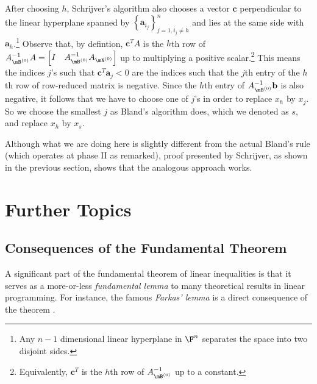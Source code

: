 \documentclass{article}
\renewcommand{\vec}{\mathbf}
\begin{document}
After choosing $h$, Schrijver's algorithm also chooses a vector $\vec{c}$ perpendicular to the linear hyperplane spanned by $\left\lbrace \vec{a}_{i_j} \right\rbrace ^n_{j=1,i_j\neq h}$ and lies at the same side with $\vec{a}_h$.\footnote{Any $n-1$ dimensional linear hyperplane in $\F^n$ separates the space into two disjoint sides.} Observe that, by defintion, $\vec{c}^{T} A$ is the $h$th row of $A_{\mB^{\left( 0 \right) }}^{-1} A=\begin{bmatrix} I & A_{\mB^{\left( 0 \right) }}^{-1} A_{\mN^{\left( 0 \right) }} \end{bmatrix}$ up to multiplying a positive scalar.\footnote{Equivalently, $\vec{c}^{T} $ is the $h$th row of $A_{\mB^{\left( 0 \right) }}^{-1} $ up to a constant.} This means the indices $j$'s such that $\vec{c}^{T} \vec{a}_j<0$ are the indices such that the $j$th entry of the $h$th row of row-reduced matrix is negative. Since the $h$th entry of $A_{\mB^{\left( 0 \right) }}^{-1} \vec{b}$ is also negative, it follows that we have to choose one of $j$'s in order to replace $x_h$ by $x_j$. So we choose the smallest $j$ as Bland's algorithm does, which we denoted as $s$, and replace $x_h$ by $x_s$.

Although what we are doing here is slightly different from the actual Bland's rule (which operates at phase II as remarked), proof presented by Schrijver, as shown in the previous section, shows that the analogous approach works.

\section{Further Topics}

\subsection{Consequences of the Fundamental Theorem}

A significant part of the fundamental theorem of linear inequalities is that it serves as a more-or-less \textit{fundamental lemma} to many theoretical results in linear programming. For instance, the famous \textit{Farkas' lemma} is a direct consequence of the theorem \cite{TLIP}.
\end{document}
